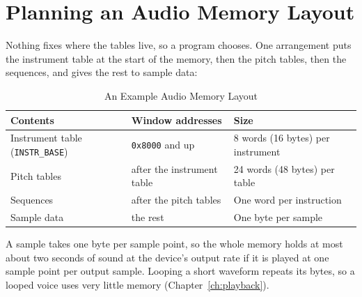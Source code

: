\section{Planning an Audio Memory Layout}
\label{sec:layout}

Nothing fixes where the tables live, so a program chooses. One arrangement puts the instrument table at the start of
the memory, then the pitch tables, then the sequences, and gives the rest to sample data:

\begin{table}[H]
	\centering
	\begin{tabular}{lll}
		\toprule
		\textbf{Contents}                       & \textbf{Window addresses}  & \textbf{Size}                     \\
		\midrule
		Instrument table (\texttt{INSTR\_BASE}) & \texttt{0x8000} and up     & 8 words (16 bytes) per instrument \\
		Pitch tables                            & after the instrument table & 24 words (48 bytes) per table     \\
		Sequences                               & after the pitch tables     & One word per instruction          \\
		Sample data                             & the rest                   & One byte per sample               \\
		\bottomrule
	\end{tabular}
	\caption{An Example Audio Memory Layout}
	\label{tab:layout}
\end{table}

A sample takes one byte per sample point, so the whole memory holds at most about two seconds of sound at the device's
output rate if it is played at one sample point per output sample. Looping a short waveform repeats its bytes, so a
looped voice uses very little memory (Chapter~\ref{ch:playback}).
